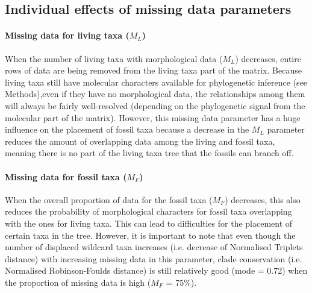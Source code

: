 \documentclass[10pt,letterpaper]{article}
\begin{document}
\subsection*{Individual effects of missing data parameters}
\paragraph*{Missing data for living taxa ($M_{L}$)}
When the number of living taxa with morphological data ($M_{L}$) decreases, entire rows of data are being removed from the living taxa part of the matrix. Because living taxa still have molecular characters available for phylogenetic inference (see Methods),even if they have no morphological data, the relationships among them will always be fairly well-resolved (depending on the phylogenetic signal from the molecular part of the matrix). However, this missing data parameter has a huge influence on the placement of fossil taxa because a decrease in the $M_{L}$ parameter reduces the amount of overlapping data among the living and fossil taxa, meaning there is no part of the living taxa tree that the fossils can branch off.

\paragraph*{Missing data for fossil taxa ($M_{F}$)}
When the overall proportion of data for the fossil taxa ($M_{F}$) decreases, this also reduces the probability of morphological characters for fossil taxa overlapping with the ones for living taxa. This can lead to difficulties for the placement of certain taxa in the tree. However, it is important to note that even though the number of displaced wildcard taxa increases (i.e. decrease of Normalised Triplets distance) with increasing missing data in this parameter, clade conservation (i.e. Normalised Robinson-Foulds distance) is still relatively good (mode = 0.72) when the proportion of missing data is high ($M_{F}$ = 75\%).
\end{document}
